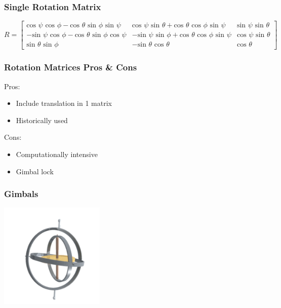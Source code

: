 \documentclass[serif,mathserif]{beamer}
\begin{document}
\begin{frame}
\frametitle{Single Rotation Matrix}
\scriptsize
  $$
R =
\begin{bmatrix}
\text{cos }\psi \text{ cos }\phi- \text{cos }\theta \text{ sin }\phi \text{ sin }\psi & \text{cos } \psi \text{ sin }\theta + \text{cos }\theta \text{ cos }\phi \text{ sin }\psi & \text{sin }\psi \text{ sin }\theta \\
-\text{sin }\psi \text{ cos }\phi - \text{cos }\theta \text{ sin }\phi \text{ cos }\psi & - \text{sin }\psi \text{ sin }\phi + \text{cos }\theta \text{ cos }\phi \text{ sin }\psi & \text{cos }\psi \text{ sin }\theta \\
\text{sin }\theta \text{ sin }\phi & - \text{sin }\theta \text{ cos }\theta & \text{cos } \theta
\end{bmatrix}
$$
\end{frame}

\begin{frame}
  \frametitle{Rotation Matrices Pros \& Cons}
  Pros:
  \begin{itemize}
    \item Include translation in 1 matrix
    \item Historically used 
  \end{itemize}
  \vspace{0.3cm}
  Cons:
  \begin{itemize}
    \item Computationally intensive
    \item Gimbal lock
  \end{itemize}
\end{frame}

\begin{frame}
  \frametitle{Gimbals}
  \centering
  \includegraphics[width=5cm]{Images/gimbal.png}
\end{frame}
\end{document}
